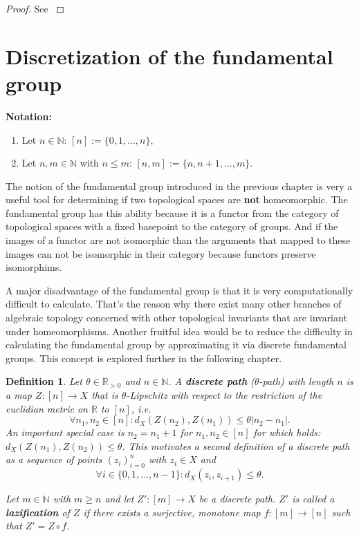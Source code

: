 \documentclass[a4paper, 11pt, twoside]{article}
\newcommand{\R}[0]{\mathbb{R}}
\newcommand{\N}[0]{\mathbb{N}}
\theoremstyle{break}
\theoremstyle{break}
\newtheorem{defin}[thm]{Definition}
\begin{document}
\begin{proof}
  See \cite[p. 175f.]{munkres2000topology}
\end{proof}

\section{Discretization of the fundamental group}
\textbf{Notation:}
\begin{enumerate}
  \item Let $n \in \N$: $[n] := \{0, 1, \ldots, n\}$,
  \item Let $n,m \in \N$ with $n \leq m$: $[n,m] := \{n, n+1, \ldots, m\}$.
\end{enumerate}

The notion of the fundamental group introduced in the previous chapter is very a useful tool for determining if two topological spaces are \textbf{not} homeomorphic.
The fundamental group has this ability because it is a functor from the category of topological spaces with a fixed basepoint to the category of groups. 
And if the images of a functor are not isomorphic than the arguments that mapped to these images can not be isomorphic in their category because functors preserve isomorphims.

A major disadvantage of the fundamental group is that it is very computationally difficult to calculate.
That's the reason why there exist many other branches of algebraic topology concerned with other topological invariants that are invariant under homeomorphisms. 
Another fruitful idea would be to reduce the difficulty in calculating the fundamental group by approximating it via discrete fundamental groups. 
This concept is explored further in the following chapter.

\begin{defin} \label{def:discrete-path}
  Let $\theta \in \R_{>0}$ and $n \in \N$. A \textbf{discrete path} ($\theta$-path) with length $n$ is a map $Z: [n] \to X$ that is $\theta$-Lipschitz with respect to the restriction of the euclidian metric on $\R$ to $[n]$, i.e.
  \begin{equation}
    \forall n_1, n_2 \in [n]\colon d_X(Z(n_2), Z(n_1)) \leq \theta |n_2 - n_1|.
  \end{equation}
  An important special case is $n_2 = n_1 + 1$ for $n_1, n_2 \in [n]$ for which holds: $d_X(Z(n_1), Z(n_2)) \leq \theta$. This motivates a second
  definition of a discrete path as a sequence of points $(z_i)_{i=0}^n$ with $z_i \in X$ and
  \begin{equation}
    \forall i \in \{0, 1, \ldots, n-1\} \colon d_X(z_i, z_{i+1}) \leq \theta.
  \end{equation}

  Let $m \in \N$ with $m \geq n$ and let $Z'\colon [m] \to X$ be a discrete path. $Z'$ is called a \textbf{lazification} of $Z$ if there exists a surjective, monotone map 
  $f\colon [m] \to [n]$ such that $Z' = Z \circ f$. 
  
  \cite[p. 3]{vigolo2018fundamental}
\end{defin}
\end{document}
